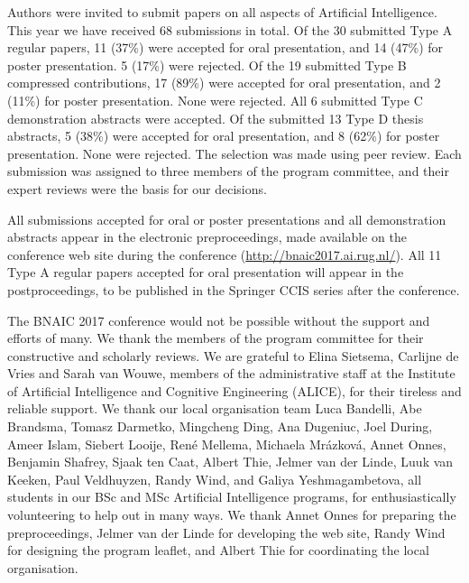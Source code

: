 \noindent Authors were invited to submit papers on all aspects of Artificial Intelligence. This year we have received 68 submissions in total. Of the 30 submitted Type A regular papers, 11 (37\%) were accepted for oral presentation, and 14 (47\%) for poster presentation. 5 (17\%) were rejected. Of the 19 submitted Type B compressed contributions, 17 (89\%) were accepted for oral presentation, and 2 (11\%) for poster presentation. None were rejected. All 6 submitted Type C demonstration abstracts were accepted. Of the submitted 13 Type D thesis abstracts, 5 (38\%) were accepted for oral presentation, and 8 (62\%) for poster presentation. None were rejected. The selection was made using peer review. Each submission was assigned to three members of the program committee, and their expert reviews were the basis for our decisions. 

All submissions accepted for oral or poster presentations and all demonstration abstracts appear in the electronic preproceedings, made available on the conference web site during the conference (\url{http://bnaic2017.ai.rug.nl/}). All 11 Type A regular papers accepted for oral presentation will appear in the postproceedings, to be published in the Springer CCIS series after the conference.

The BNAIC 2017 conference would not be possible without the support and efforts of many. We thank the members of the program committee for their constructive and scholarly reviews. We are grateful to 
    Elina Sietsema, Carlijne de Vries and 
		Sarah van Wouwe, members of the administrative staff at the Institute of Artificial Intelligence and Cognitive Engineering (ALICE), for their tireless and reliable support. We thank our local organisation team 
		Luca Bandelli,
    Abe Brandsma,
    Tomasz Darmetko,
    Mingcheng Ding,
    Ana Dugeniuc,
    Joel During,
    Ameer Islam,
    Siebert Looije,
    Ren\'{e} Mellema,
    Michaela Mr\'{a}zkov\'{a},
    Annet Onnes,
    Benjamin Shafrey,
    Sjaak ten Caat,
    Albert Thie,
    Jelmer van der Linde,
    Luuk van Keeken,
    Paul Veldhuyzen,
    Randy Wind, and
    Galiya Yeshmagambetova, 
all students in our BSc and MSc Artificial Intelligence programs, for enthusiastically volunteering to help out in many ways. We thank Annet Onnes for preparing the preproceedings, Jelmer van der Linde for developing the web site, Randy Wind for designing the program leaflet, and Albert Thie for coordinating the local organisation.
		
